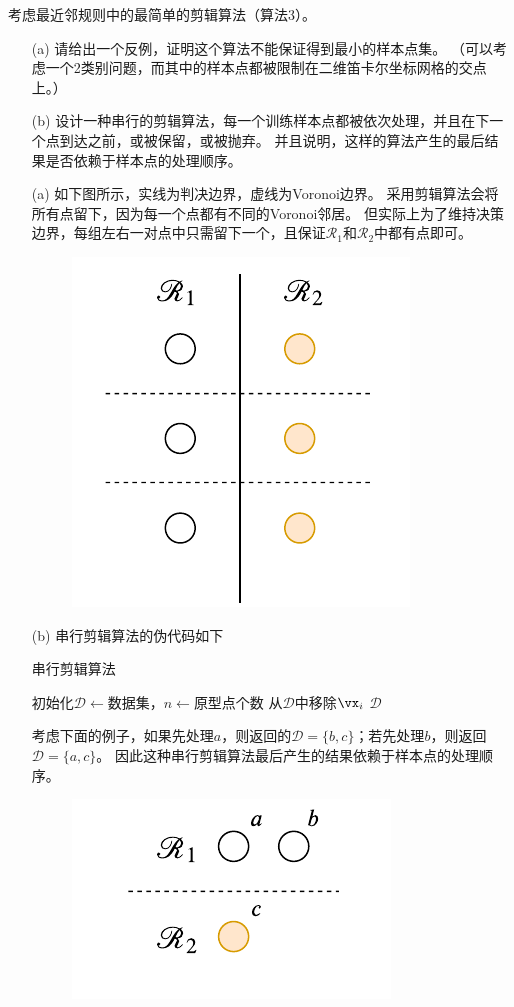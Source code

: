 \documentclass[reportComp]{thesis}
\begin{document}
\begin{question}[\textsection 4 Q16]
考虑最近邻规则中的最简单的剪辑算法（算法3）。
\begin{itemize}
	\item [(a)] 请给出一个反例，证明这个算法不能保证得到最小的样本点集。
	（可以考虑一个2类别问题，而其中的样本点都被限制在二维笛卡尔坐标网格的交点上。）
	\item [(b)] 设计一种串行的剪辑算法，每一个训练样本点都被依次处理，并且在下一个点到达之前，或被保留，或被抛弃。
	并且说明，这样的算法产生的最后结果是否依赖于样本点的处理顺序。
\end{itemize}
\end{question}
\begin{answer}
\begin{itemize}
	\item [(a)] 如下图所示，实线为判决边界，虚线为Voronoi边界。
	采用剪辑算法会将所有点留下，因为每一个点都有不同的Voronoi邻居。
	但实际上为了维持决策边界，每组左右一对点中只需留下一个，且保证$\mathcal{R}_1$和$\mathcal{R}_2$中都有点即可。
	\begin{figure}[H]
	\centering
	\includegraphics[width=0.35\linewidth]{fig/edit.pdf}
	\end{figure}
	\item [(b)] 串行剪辑算法的伪代码如下
\begin{algorithm}
\caption{串行剪辑算法}
\begin{algorithmic}[1]
\State 初始化$\mathcal{D}\gets$数据集，$n\gets$原型点个数
\State 从$\mathcal{D}$中移除$\vx_i$
\EndIf
\EndFor
\State\Return $\mathcal{D}$
\end{algorithmic}
\end{algorithm}

	考虑下面的例子，如果先处理$a$，则返回的$\mathcal{D}=\{b,c\}$；若先处理$b$，则返回$\mathcal{D}=\{a,c\}$。
	因此这种串行剪辑算法最后产生的结果依赖于样本点的处理顺序。
	\begin{figure}[H]
	\centering
	\includegraphics[width=0.3\linewidth]{fig/edit2.pdf}
	\end{figure}
\end{itemize}
\end{answer}
\end{document}
